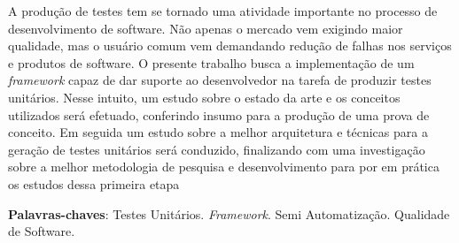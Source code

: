 \begin{resumo}
A produção de testes tem se tornado uma atividade importante no processo de desenvolvimento de software. Não apenas o mercado vem exigindo maior qualidade, mas o usuário comum vem demandando redução de falhas nos serviços e produtos de software. O presente trabalho busca a implementação de um \textit{framework} capaz de dar suporte ao desenvolvedor na tarefa de produzir testes unitários. Nesse intuito, um estudo sobre o estado da arte e os conceitos utilizados será efetuado, conferindo insumo para a produção de uma prova de conceito. Em seguida um estudo sobre a melhor arquitetura e técnicas para a geração de testes unitários será conduzido, finalizando com uma investigação sobre a melhor metodologia de pesquisa e desenvolvimento para por em prática os estudos dessa primeira etapa

\vspace{\onelineskip}
    
\noindent
\textbf{Palavras-chaves}: Testes Unitários. \textit{Framework}. Semi Automatização. Qualidade de Software.
\end{resumo}
